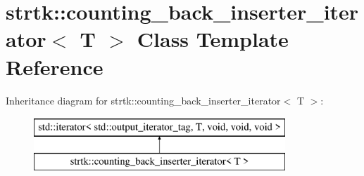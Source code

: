 \hypertarget{classstrtk_1_1counting__back__inserter__iterator}{\section{strtk\-:\-:counting\-\_\-back\-\_\-inserter\-\_\-iterator$<$ T $>$ Class Template Reference}
\label{classstrtk_1_1counting__back__inserter__iterator}
}
Inheritance diagram for strtk\-:\-:counting\-\_\-back\-\_\-inserter\-\_\-iterator$<$ T $>$\-:\begin{figure}[H]
\begin{center}
\leavevmode
\includegraphics[height=2.000000cm]{classstrtk_1_1counting__back__inserter__iterator}
\end{center}
\end{figure}
